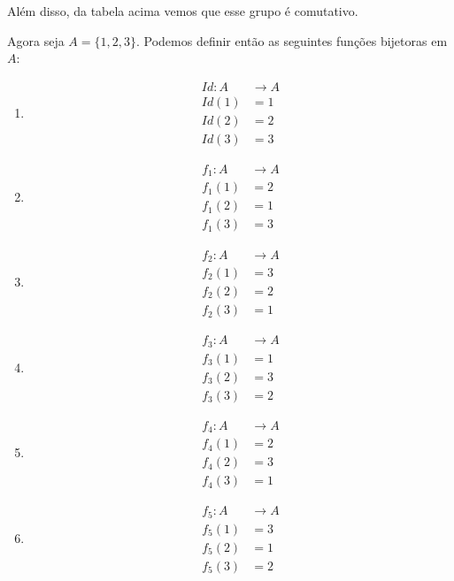 Além disso, da tabela acima vemos que esse grupo é comutativo.

Agora seja $A = \{1, 2, 3\}$. Podemos definir então as seguintes funções bijetoras em $A$:
\begin{multicols}{3}
    \begin{enumerate}
        \item[] \begin{align*}
            Id : A &\to A\\
            Id(1) &= 1\\
            Id(2) &= 2\\
            Id(3) &= 3
        \end{align*}
        \item[] \begin{align*}
            f_1 : A &\to A\\
            f_1(1) &= 2\\
            f_1(2) &= 1\\
            f_1(3) &= 3
        \end{align*}
        \item[] \begin{align*}
            f_2 : A &\to A\\
            f_2(1) &= 3\\
            f_2(2) &= 2\\
            f_2(3) &= 1
        \end{align*}
        \item[] \begin{align*}
            f_3 : A &\to A\\
            f_3(1) &= 1\\
            f_3(2) &= 3\\
            f_3(3) &= 2
        \end{align*}
        \item[] \begin{align*}
            f_4 : A &\to A\\
            f_4(1) &= 2\\
            f_4(2) &= 3\\
            f_4(3) &= 1
        \end{align*}
        \item[] \begin{align*}
            f_5 : A &\to A\\
            f_5(1) &= 3\\
            f_5(2) &= 1\\
            f_5(3) &= 2
        \end{align*}
    \end{enumerate}
\end{multicols}


